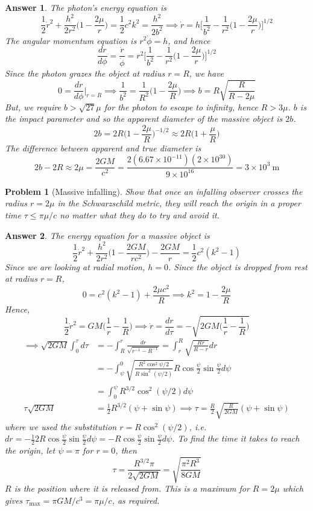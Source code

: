 \documentclass[a4paper]{article}
\theoremstyle{new2}
\newtheorem{ans}{Answer}[section]
\theoremstyle{new}
\newtheorem{qns}{Problem}[section]
\begin{document}
\begin{ans}
The photon's energy equation is
$$\frac{1}{2}\dot{r}^2+\frac{h^2}{2r^2}\bigg(1-\frac{2\mu}{r}\bigg)=\frac{1}{2}c^2k^2=\frac{h^2}{2b^2}\implies\dot{r}=h\bigg[\frac{1}{b^2}-\frac{1}{r^2}\bigg(1-\frac{2\mu}{r}\bigg)\bigg]^{1/2}$$
The angular momentum equation is $r^2\dot{\phi}=h$, and hence
$$\frac{dr}{d\phi}=\frac{\dot{r}}{\dot{\phi}}=r^2\bigg[\frac{1}{b^2}-\frac{1}{r^2}\bigg(1-\frac{2\mu}{r}\bigg)\bigg]^{1/2}$$
Since the photon grazes the object at radius $r=R$, we have
$$0=\frac{dr}{d\phi}\bigg|_{r=R}\implies\frac{1}{b^2}=\frac{1}{R^2}\bigg(1-\frac{2\mu}{R}\bigg)\implies b=R\sqrt{\frac{R}{R-2\mu}}$$
But, we require $b>\sqrt{27}\mu$ for the photon to escape to infinity, hence $R>3\mu$. $b$ is the impact parameter and so the apparent diameter of the massive object is $2b$.
$$2b=2R\bigg(1-\frac{2\mu}{R}\bigg)^{-1/2}\approx 2R\bigg(1+\frac{\mu}{R}\bigg)$$
The difference between apparent and true diameter is
$$2b-2R\approx 2\mu=\frac{2GM}{c^2}=\frac{2(6.67\times10^{-11})(2\times10^{30})}{9\times10^{16}}=3\times10^3~\text{m}$$
\end{ans}
\newpage
\begin{qns}[Massive infalling]
Show that once an infalling observer crosses the radius $r = 2\mu$ in the Schwarzschild metric, they will reach the origin in a proper time $\tau\leq\pi\mu/c$ no matter what they do to try and avoid it.
\end{qns}
\begin{ans}
The energy equation for a massive object is
$$\frac{1}{2}\dot{r}^2+\frac{h^2}{2r^2}\bigg(1-\frac{2GM}{rc^2}\bigg)-\frac{2GM}{r}=\frac{1}{2}c^2(k^2-1)$$
Since we are looking at radial motion, $h=0$. Since the object is dropped from rest at radius $r=R$,
$$0=c^2(k^2-1)+\frac{2\mu c^2}{R}\implies k^2=1-\frac{2\mu}{R}$$
Hence,
$$\frac{1}{2}\dot{r}^2=GM\bigg(\frac{1}{r}-\frac{1}{R}\bigg)\implies\dot{r}=\frac{dr}{d\tau}=-\sqrt{2GM\bigg(\frac{1}{r}-\frac{1}{R}\bigg)}$$
\begin{align}
\implies\sqrt{2GM}\int_0^\tau d\tau&=-\int_R^r\frac{dr}{\sqrt{r^{-1}-R^{-1}}}=\int_r^R\sqrt{\frac{Rr}{R-r}}dr\nonumber\\&=-\int_\psi^0\sqrt{\frac{R^2\cos^2\psi/2}{R\sin^2(\psi/2)}}R\cos\frac{\psi}{2}\sin\frac{\psi}{2}d\psi\nonumber\\&=\int_0^\psi R^{3/2}\cos^2(\psi/2)d\psi\nonumber\\\tau\sqrt{2GM}&=\frac{1}{2}R^{3/2}(\psi+\sin\psi)\implies\tau=\frac{R}{2}\sqrt{\frac{R}{2GM}}(\psi+\sin\psi)\nonumber
\end{align}
where we used the substitution $r=R\cos^2(\psi/2)$, i.e. $dr=-\frac{1}{2}2R\cos\frac{\psi}{2}\sin\frac{\psi}{2}d\psi=-R\cos\frac{\psi}{2}\sin\frac{\psi}{2}d\psi$. To find the time it takes to reach the origin, let $\psi=\pi$ for $r=0$, then
$$\tau=\frac{R^{3/2}\pi}{2\sqrt{2GM}}=\sqrt{\frac{\pi^2R^3}{8GM}}$$
$R$ is the position where it is released from. This is a maximum for $R=2\mu$ which gives $\tau_{\text{max}}=\pi GM/c^3=\pi\mu/c$, as required.
\end{ans}
\newpage
\end{document}
